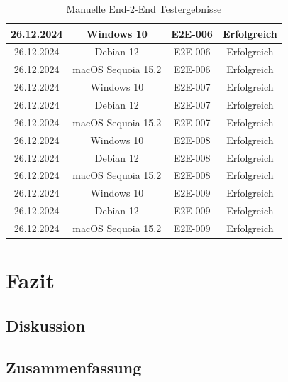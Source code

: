 \documentclass[a4paper,12pt]{report}
\begin{document}
\begin{table}[h!]
\begin{tabular}{|c|c|c|c|}
            26.12.2024     & Windows 10              & E2E-006           & Erfolgreich       \\ \hline
            26.12.2024     & Debian 12               & E2E-006           & Erfolgreich       \\ \hline
            26.12.2024     & macOS Sequoia 15.2      & E2E-006           & Erfolgreich       \\ \hline
            26.12.2024     & Windows 10              & E2E-007           & Erfolgreich       \\ \hline
            26.12.2024     & Debian 12               & E2E-007           & Erfolgreich       \\ \hline
            26.12.2024     & macOS Sequoia 15.2      & E2E-007           & Erfolgreich       \\ \hline
            26.12.2024     & Windows 10              & E2E-008           & Erfolgreich       \\ \hline
            26.12.2024     & Debian 12               & E2E-008           & Erfolgreich       \\ \hline
            26.12.2024     & macOS Sequoia 15.2      & E2E-008           & Erfolgreich       \\ \hline
            26.12.2024     & Windows 10              & E2E-009           & Erfolgreich       \\ \hline
            26.12.2024     & Debian 12               & E2E-009           & Erfolgreich       \\ \hline
            26.12.2024     & macOS Sequoia 15.2      & E2E-009           & Erfolgreich       \\ \hline

        \end{tabular}
        \caption{Manuelle End-2-End Testergebnisse}\label{tab:e2e-results}
    \end{table}


    \chapter{Fazit}


    \section{Diskussion}


    \section{Zusammenfassung}
\end{document}
